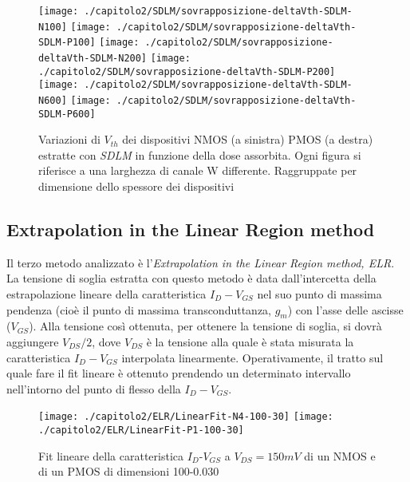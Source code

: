 \begin{figure}[H]
  \centering
  \texttt{[image: ./capitolo2/SDLM/sovrapposizione-deltaVth-SDLM-N100]}
  \texttt{[image: ./capitolo2/SDLM/sovrapposizione-deltaVth-SDLM-P100]}
  \texttt{[image: ./capitolo2/SDLM/sovrapposizione-deltaVth-SDLM-N200]}
  \texttt{[image: ./capitolo2/SDLM/sovrapposizione-deltaVth-SDLM-P200]}
  \texttt{[image: ./capitolo2/SDLM/sovrapposizione-deltaVth-SDLM-N600]}
  \texttt{[image: ./capitolo2/SDLM/sovrapposizione-deltaVth-SDLM-P600]}
  \caption{Variazioni di $V_{th}$ dei dispositivi NMOS (a sinistra) PMOS (a destra) estratte con \emph{SDLM} in funzione della dose assorbita. Ogni figura si riferisce a una larghezza di canale W differente. Raggruppate per dimensione dello spessore dei dispositivi}
  \label{fig:deltaVthSDLM}
\end{figure}

\subsection[ELR]{Extrapolation in the Linear Region method}
Il terzo metodo analizzato è l'\emph{Extrapolation in the Linear Region method, ELR}\cite{art2}. La tensione di soglia estratta con questo metodo è data dall'intercetta della estrapolazione lineare della caratteristica $I_D-V_{GS}$ nel suo punto di massima pendenza (cioè il punto di massima transconduttanza, $g_m$) con l'asse delle ascisse ($V_{GS}$). Alla tensione così ottenuta, per ottenere la tensione di soglia, si dovrà aggiungere $V_{DS}/2$, dove $V_{DS}$ è la tensione alla quale è stata misurata la caratteristica $I_D-V_{GS}$ interpolata linearmente.
Operativamente, il tratto sul quale fare il fit lineare è ottenuto prendendo un determinato intervallo nell'intorno del punto di flesso della $I_D-V_{GS}$.

\begin{figure}[h!]
  \centering
  \texttt{[image: ./capitolo2/ELR/LinearFit-N4-100-30]}
  \texttt{[image: ./capitolo2/ELR/LinearFit-P1-100-30]}
  \caption{Fit lineare della caratteristica  $I_D$-$V_{GS}$ a $V_{DS}=150mV$ di un NMOS e di un PMOS di dimensioni 100-0.030 }
\end{figure}

